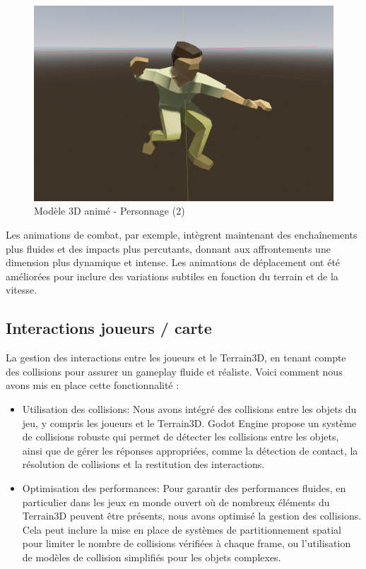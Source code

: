 \documentclass[
	article,			%
	11pt,				%
	oneside,			%
	a4paper,			%
	chapter=TITLE,
	french,			%
	sumario=tradicional
	]{base_nt}
\begin{document}
\begin{figure}[ht]
	\caption{Modèle 3D animé - Personnage (2)}
	\centering
	\includegraphics[width=1\linewidth]{paper16.png}
	\legend{}
	
\end{figure}

Les animations de combat, par exemple, intègrent maintenant des enchaînements plus fluides et des impacts plus percutants, donnant aux affrontements une dimension plus dynamique et intense. Les animations de déplacement ont été améliorées pour inclure des variations subtiles en fonction du terrain et de la vitesse.

\newpage

\vspace{0cm}

\subsection{Interactions joueurs / carte}


La gestion des interactions entre les joueurs et le Terrain3D, en tenant compte des collisions pour assurer un gameplay fluide et réaliste. Voici comment nous avons mis en place cette fonctionnalité :

\begin{itemize}
    \item Utilisation des collisions: Nous avons intégré des collisions entre les objets du jeu, y compris les joueurs et le Terrain3D. Godot Engine propose un système de collisions robuste qui permet de détecter les collisions entre les objets, ainsi que de gérer les réponses appropriées, comme la détection de contact, la résolution de collisions et la restitution des interactions.
    \item Optimisation des performances: Pour garantir des performances fluides, en particulier dans les jeux en monde ouvert où de nombreux éléments du Terrain3D peuvent être présents, nous avons optimisé la gestion des collisions. Cela peut inclure la mise en place de systèmes de partitionnement spatial pour limiter le nombre de collisions vérifiées à chaque frame, ou l'utilisation de modèles de collision simplifiés pour les objets complexes.
\end{itemize}
\end{document}
